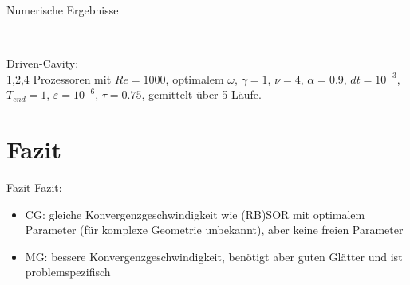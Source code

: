 \documentclass[aspectratio=169]{beamer}
\theoremstyle{thm}
\begin{document}
\begin{frame}{Numerische Ergebnisse}
  \begin{minipage}{0.59\linewidth}
  \end{minipage}
  \begin{minipage}{0.4\linewidth}\small~\vspace{4cm}
  
  Driven-Cavity: \\
  1,2,4 Prozessoren mit $Re = 1000$, optimalem $\omega$,
  $\gamma = 1$, $\nu = 4$, $\alpha = 0.9$, $dt = 10^{-3}$, $T_{end} = 1$,
  $\varepsilon = 10^{-6}$, $\tau = 0.75$,
  gemittelt über 5 Läufe.
  \end{minipage}
\end{frame}

\section{Fazit}\label{sec:Fazit}
\begin{frame}{Fazit}
  Fazit:
  \begin{itemize}[<+(1)->]
    \item CG: gleiche Konvergenzgeschwindigkeit wie (RB)SOR mit optimalem
        Parameter (für komplexe Geometrie unbekannt), aber keine freien Parameter
    \item MG: bessere Konvergenzgeschwindigkeit, benötigt aber guten Glätter
        und ist problemspezifisch
  \end{itemize}
\end{frame}
\end{document}
